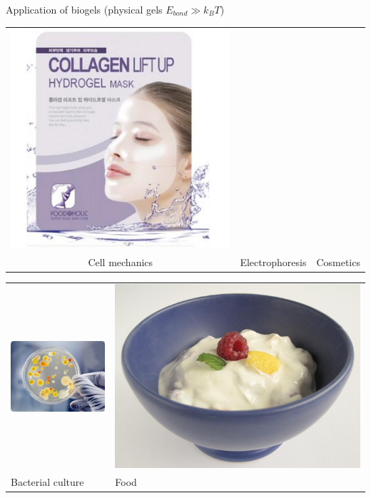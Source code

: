 \documentclass[xcolor=table]{beamer}
\begin{document}
\begin{frame}{Application of biogels \textup{\normalsize(physical gels
$E_{bond}\gg k_B T$)}}
\begin{tabu}{cX[c]c}
\includegraphics[height=0.3\textheight]{cosmetics} \\
Cell mechanics & Electrophoresis & Cosmetics\\
\end{tabu}
\begin{tabu}{X[c]X[c]}
\includegraphics[height=0.3\textheight]{bacterial_culture} &
\includegraphics[height=0.3\textheight]{food} \\
Bacterial culture & Food\\
\end{tabu}


\end{frame}
\end{document}
